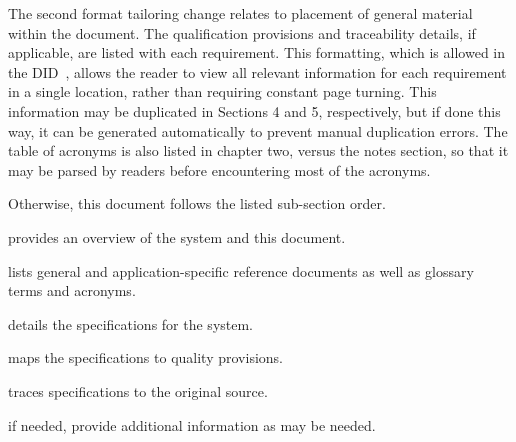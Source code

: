 
The second format tailoring change relates to placement of general material within the document. 
The qualification provisions and traceability details, if applicable, are listed with each requirement.
This formatting, which is allowed in the \SSS DID~\cite{ref__SSS_DID}, allows the reader to view all relevant information for each requirement in a single location, rather than requiring constant page turning.
This information may be duplicated in Sections 4 and 5, respectively, but if done this way, it can be generated automatically to prevent manual duplication errors.
The table of acronyms is also listed in chapter two, versus the notes section, so that it may be parsed by readers before encountering most of the acronyms.

Otherwise, this document follows the listed \SSS sub-section order.
\begin{description}[itemindent=5pt,topsep=0pt,itemsep=0pt,partopsep=0pt, parsep=0pt]
	\item[Section 1] provides an overview of the system and this document.
	\item[Section 2] lists general and application-specific reference documents as well as glossary terms and acronyms. 
	\item[Section 3] details the specifications for the system.
	\item[Section 4] maps the specifications to quality provisions. 
	\item[Section 5] traces specifications to the original source.
	\item[Appendices] if needed, provide additional information as may be needed.
\end{description}


